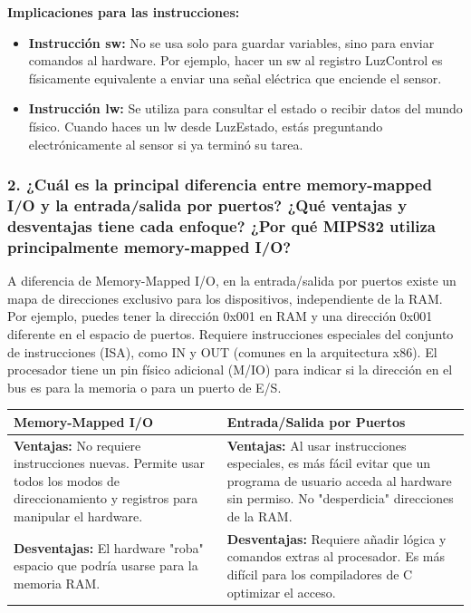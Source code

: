 \documentclass[12pt,a4paper]{article}
\begin{document}
\textbf{Implicaciones para las instrucciones:}
\begin{itemize}
    \item \textbf{Instrucción sw:} No se usa solo para guardar variables, sino para enviar comandos al hardware. Por ejemplo, hacer un sw al registro LuzControl es físicamente equivalente a enviar una señal eléctrica que enciende el sensor.
    \item \textbf{Instrucción lw:} Se utiliza para consultar el estado o recibir datos del mundo físico. Cuando haces un lw desde LuzEstado, estás preguntando electrónicamente al sensor si ya terminó su tarea.
\end{itemize}

\subsubsection{2. ¿Cuál es la principal diferencia entre memory-mapped I/O y la entrada/salida por puertos? ¿Qué ventajas y desventajas tiene cada enfoque? ¿Por qué MIPS32 utiliza principalmente memory-mapped I/O?}

A diferencia de Memory-Mapped I/O, en la entrada/salida por puertos existe un mapa de direcciones exclusivo para los dispositivos, independiente de la RAM. Por ejemplo, puedes tener la dirección 0x001 en RAM y una dirección 0x001 diferente en el espacio de puertos. Requiere instrucciones especiales del conjunto de instrucciones (ISA), como IN y OUT (comunes en la arquitectura x86). El procesador tiene un pin físico adicional (M/IO) para indicar si la dirección en el bus es para la memoria o para un puerto de E/S.

\begin{table}[H]
\centering
\begin{tabular}{|p{}|p{}|}
\hline
\textbf{Memory-Mapped I/O} & \textbf{Entrada/Salida por Puertos} \\ \hline
\textbf{Ventajas:} No requiere instrucciones nuevas. Permite usar todos los modos de direccionamiento y registros para manipular el hardware. & \textbf{Ventajas:} Al usar instrucciones especiales, es más fácil evitar que un programa de usuario acceda al hardware sin permiso. No "desperdicia" direcciones de la RAM. \\ \hline
\textbf{Desventajas:} El hardware "roba" espacio que podría usarse para la memoria RAM. & \textbf{Desventajas:} Requiere añadir lógica y comandos extras al procesador. Es más difícil para los compiladores de C optimizar el acceso. \\ \hline
\end{tabular}
\end{table}
\end{document}
